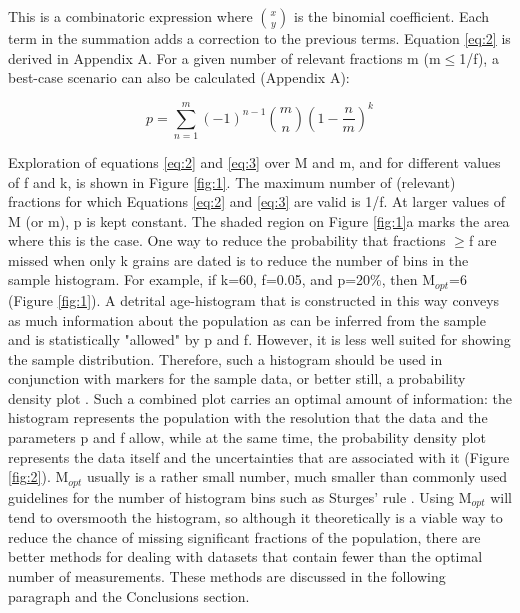 \documentclass[12]{article}
\begin{document}
This is a combinatoric expression where $\binom{x}{y}$ is the binomial
coefficient.   Each term  in the  summation adds  a correction  to the
previous terms. Equation  \ref{eq:2} is derived in Appendix  A.  For a
given  number  of  relevant  fractions  m  (m$\leq$1/f),  a  best-case
scenario can also be calculated (Appendix A):

\begin{equation}
  \label{eq:3}
p  =  \sum_{n=1}^{m}(-1)^{n-1} \binom{m}{n}\left(1-\frac{n}{m}\right)^k
\end{equation}

Exploration of equations  \ref{eq:2} and \ref{eq:3} over M  and m, and
for different values of f and  k, is shown in Figure \ref{fig:1}.  The
maximum number of (relevant)  fractions for which Equations \ref{eq:2}
and \ref{eq:3} are valid  is 1/f.  At larger values of M  (or m), p is
kept  constant.  The shaded  region on  Figure \ref{fig:1}a  marks the
area where this  is the case.  One way to  reduce the probability that
fractions  $\geq$f  are missed  when only  k grains  are dated  is to
reduce the  number of bins in  the sample histogram.   For example, if
k=60, f=0.05,  and p=20\%,  then M$_{opt}$=6 (Figure  \ref{fig:1}).  A
detrital age-histogram that is constructed in this way conveys as much
information about  the population as  can be inferred from  the sample
and is statistically  "allowed" by p and f.  However,  it is less well
suited  for  showing  the  sample  distribution.   Therefore,  such  a
histogram should  be used in  conjunction with markers for  the sample
data,    or    better    still,    a    probability    density    plot
\cite{silverman1986}.  Such a combined  plot carries an optimal amount
of  information:  the histogram  represents  the  population with  the
resolution that  the data and the  parameters p and f  allow, while at
the same time, the probability density plot represents the data itself
and   the  uncertainties   that   are  associated   with  it   (Figure
\ref{fig:2}). M$_{opt}$ usually is a rather small number, much smaller
than commonly used guidelines for the number of histogram bins such as
Sturges' rule \cite{sturges1926,scott1992}.  Using M$_{opt}$ will tend
to oversmooth the histogram, so  although it theoretically is a viable
way  to reduce  the chance  of  missing significant  fractions of  the
population, there  are better methods  for dealing with  datasets that
contain fewer than the  optimal number of measurements.  These methods
are  discussed   in  the  following  paragraph   and  the  Conclusions
section.
\end{document}

